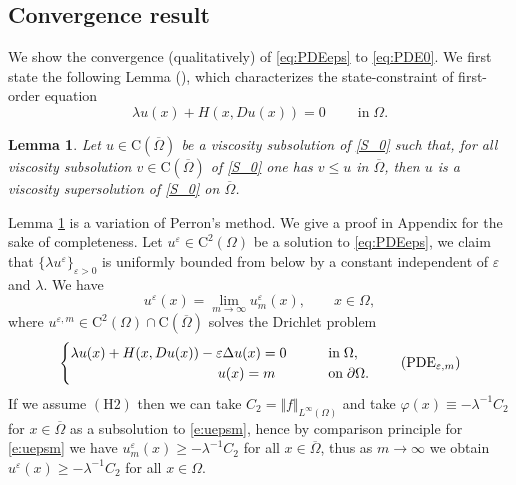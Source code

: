 \documentclass[11pt,reqno]{amsart}
\numberwithin{figure}{section}
\theoremstyle{plain}
\newtheorem{lem}[thm]{Lemma}
\theoremstyle{remark}
\numberwithin{equation}{section}
\newcommand{\rmC}{\mathrm{C}}
\begin{document}
\subsection{Convergence result} We show the convergence (qualitatively) of \eqref{eq:PDEeps} to \eqref{eq:PDE0}. We first state the following Lemma (\cite{Capuzzo-Dolcetta1990}), which characterizes the state-constraint of first-order equation
\begin{equation}\label{S_0}
 \lambda u(x) + H(x,Du(x)) = 0\;\qquad\text{in}\;\Omega. \tag{$S_0$}
\end{equation}

\begin{lem}\label{lem:max} Let $u\in \rmC(\overline{\Omega})$ be a viscosity subsolution of \eqref{S_0} such that, for all viscosity subsolution $v\in \rmC(\overline{\Omega})$ of \eqref{S_0} one has $v\leq u$ in $\overline{\Omega}$, then $u$ is a viscosity supersolution of \eqref{S_0} on $\overline{\Omega}$.
\end{lem}
\noindent Lemma \ref{lem:max} is a variation of Perron's method. We give a proof in Appendix for the sake of completeness. Let $u^\varepsilon\in \mathrm{C}^2(\Omega)$ be a solution to \eqref{eq:PDEeps}, we claim that $\{\lambda u^\varepsilon\}_{\varepsilon>0}$ is uniformly bounded from below by a constant independent of $\varepsilon$ and $\lambda$. We have
\begin{equation*}
    u^\varepsilon(x) = \lim_{m\to \infty} u^{\varepsilon}_m(x), \qquad x\in \Omega,
\end{equation*}
where $u^{\varepsilon,m}\in \mathrm{C}^2(\Omega)\cap \rmC(\overline{\Omega})$ solves the Drichlet problem
\begin{equation}\label{e:uepsm}
    \begin{cases}
    \lambda u(x) + H(x,Du(x)) - \varepsilon \Delta u(x) = 0 &\qquad
    \text{in}\;\Omega, \vspace{0cm}\\
    \;\;\quad\quad\qquad\qquad\qquad\qquad u(x) = m &\qquad
    \text{on}\;\partial\Omega.
    \end{cases} \tag{PDE$_{\varepsilon,m}$}
\end{equation}
If we assume $\mathrm{(H2)}$ then we can take $C_2 = \Vert f\Vert_{L^\infty(\Omega)}$ and take $\varphi(x) \equiv -\lambda^{-1}C_2$ for $x\in \overline{\Omega}$ as a subsolution to \eqref{e:uepsm}, hence by comparison principle for \eqref{e:uepsm} we have $u^{\varepsilon}_m(x)\geq -\lambda^{-1}C_2$ for all $x\in \overline{\Omega}$, thus as $m\to \infty$ we obtain $u^\varepsilon(x) \geq -\lambda^{-1}C_2$ for all $x\in \Omega$.
\end{document}
